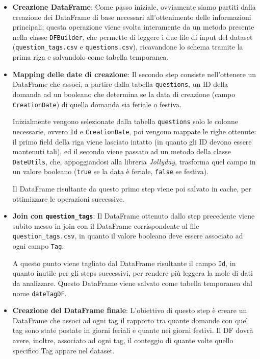   \begin{itemize}
    \item
      \textbf{Creazione DataFrame}\label{par:job1:spark:implementation:firststep}:
      Come passo iniziale, ovviamente siamo partiti dalla creazione dei DataFrame di base necessari all'ottenimento delle informazioni principali;
      questa operazione viene svolta interamente da un metodo presente nella classe \texttt{DFBuilder},
      che permette di leggere i due file di input del dataset (\texttt{question\_tags.csv} e \texttt{questions.csv}),
      ricavandone lo schema tramite la prima riga e salvandolo come tabella temporanea.
    \item
      \textbf{Mapping delle date di creazione}:
      Il secondo step consiste nell'ottenere un DataFrame che associ, a partire dalla tabella \texttt{questions},
      un ID della domanda ad un booleano che determina se la data di creazione (campo \texttt{CreationDate}) di quella domanda sia feriale o festiva.

      Inizialmente vengono selezionate dalla tabella \texttt{questions} solo le colonne necessarie, ovvero \texttt{Id} e \texttt{CreationDate}, poi vengono mappate le righe ottenute:
      il primo field della riga viene lasciato intatto (in quanto gli ID devono essere mantenuti tali),
      ed il secondo viene passato ad un metodo della classe \texttt{DateUtils}, che, appoggiandosi alla libreria \textit{Jollyday}, trasforma quel campo in un valore booleano
      (\texttt{true} se la data è feriale, \texttt{false} se festiva).

      Il DataFrame risultante da questo primo step viene poi salvato in cache, per ottimizzare le operazioni successive.

    \item
      \textbf{Join con \texttt{question\_tags}}:
      Il DataFrame ottenuto dallo step precedente viene subito messo in join con il DataFrame corrispondente al file \texttt{question\_tags.csv},
      in quanto il valore booleano deve essere associato ad ogni campo \texttt{Tag}.

      A questo punto viene tagliato dal DataFrame risultante il campo \texttt{Id}, in quanto inutile per gli steps successivi, per rendere più leggera la mole di dati da analizzare.
      Questo DataFrame viene salvato come tabella temporanea dal nome \texttt{dateTagDF}.

    \item
      \textbf{Creazione del DataFrame finale}:
      L'obiettivo di questo step è creare un DataFrame che associ ad ogni tag il rapporto tra quante domande con quel tag sono state postate in giorni feriali e quante nei giorni festivi.
      Il DF dovrà avere, inoltre, associato ad ogni tag, il conteggio di quante volte quello specifico Tag appare nel dataset.


\end{itemize}
